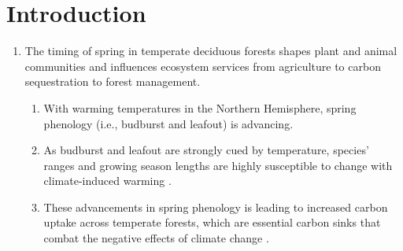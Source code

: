 \documentclass{article}\usepackage[]{graphicx}\usepackage[]{color}
\begin{document}
\section*{Introduction}
\begin{enumerate}
\item The timing of spring in temperate deciduous forests shapes plant and animal communities and influences ecosystem services from agriculture to carbon sequestration to forest management. 
  \begin{enumerate} 
  \item With warming temperatures in the Northern Hemisphere, spring phenology (i.e., budburst and leafout) is advancing.
  \item As budburst and leafout are strongly cued by temperature, species' ranges and growing season lengths are highly susceptible to change with climate-induced warming \citep{Chuine2001}. 
  \item These advancements in spring phenology is leading to increased carbon uptake across temperate forests, which are essential carbon sinks that combat the negative effects of climate change \citep{Keenan2014}.
  \end{enumerate}
  

\end{enumerate}
\end{document}
